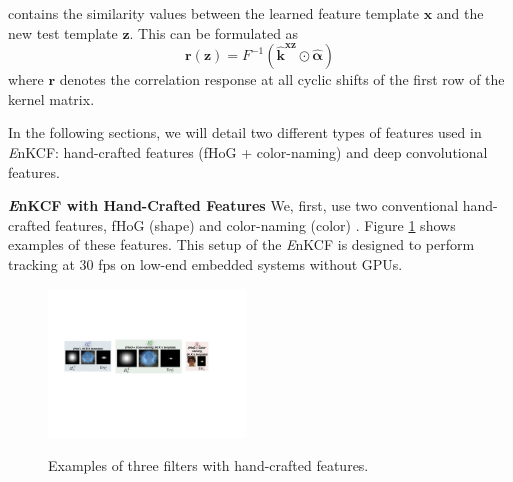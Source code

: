 \documentclass[10pt,twocolumn,letterpaper]{article}
\begin{document}
contains the similarity values between the learned feature template
$\mathbf{x}$ and the new test template $\mathbf{z}$. This can be
formulated as
\begin{equation}
\mathbf{r(z)} = F^{-1}(\mathbf{\hat{k}^{xz}} \odot \mathbf{\hat{\alpha}})
\end{equation}
where $\mathbf{r}$ denotes the correlation response at all cyclic shifts of the
first row of the kernel matrix.

In the following sections, we will detail two different types of
features used in {\it E}nKCF: hand-crafted features (fHoG +
color-naming) and deep convolutional features.

\textbf{{\it E}nKCF with Hand-Crafted Features} We, first, use two
conventional hand-crafted features, fHoG (shape)
\cite{felzenszwalb2010object} and color-naming (color)
\cite{li2014scale}. Figure \ref{fig:Filters} shows examples of these
features. This setup of the {\it E}nKCF is designed to perform
tracking at $30$ fps on low-end embedded systems without GPUs.
\begin{figure}[!h]
\centering
\includegraphics[width=0.47\textwidth]{./figures/Filters_Details.pdf}
   \\[-3ex]
\label{fig:Rt_S}
\quad{}\label{fig:Rt_L}
\quad\quad{}\label{fig:Rs}
\caption{Examples of three filters with hand-crafted features.}
\label{fig:Filters}
\end{figure}
\end{document}
